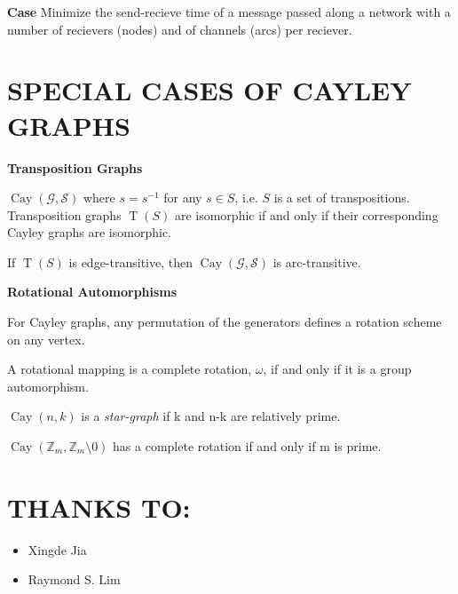 \documentclass[a4paper,10pt,english]{sphinxhowto}
\begin{document}
\textbf{Case}
Minimize the send-recieve time of a message passed along a network with a number of recievers (nodes) and of channels (arcs) per reciever.


\newpage
\section*{SPECIAL CASES OF CAYLEY GRAPHS}

\textbf{Transposition Graphs}

$\operatorname{Cay}(\mathcal{G}, \mathcal{S})$ where $s=s^{-1}$ for any $s \in S$, i.e. $S$ is a set of transpositions. Transposition graphs $\operatorname{T}(S)$ are isomorphic if and only if their corresponding Cayley graphs are isomorphic.

If $\operatorname{T}(S)$ is edge-transitive, then $\operatorname{Cay}(\mathcal{G}, \mathcal{S})$ is arc-transitive.

\textbf{Rotational Automorphisms}

For Cayley graphs, any permutation of the generators defines a rotation scheme on any vertex.

A rotational mapping is a complete rotation, $\omega$, if and only if it is a group automorphism.

$\operatorname{Cay}(n, k)$ is a \emph{star-graph} if k and n-k are relatively prime.

$\operatorname{Cay}(\mathbb{Z}_{m}, \mathbb{Z}_{m}\setminus 0)$ has a complete rotation if and only if m is prime.

\newpage
\section*{THANKS TO:}
\label{index:thanks}

\begin{itemize}
\item {}Xingde Jia
\item {}Raymond S. Lim
\end{itemize}

\renewcommand{\indexname}{Index}
\printindex
\end{document}
